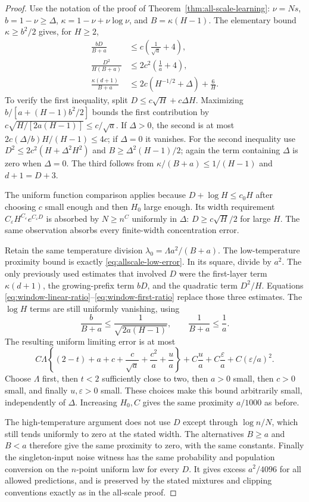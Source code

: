 \begin{proof}
Use the notation of the proof of Theorem~\ref{thm:all-scale-learning}:
$\nu=Ns$, $b=1-\nu\ge\Delta$,
$\kappa=1-\nu+\nu\log\nu$, and $B=\kappa(H-1)$.
The elementary bound $\kappa\ge b^2/2$ gives, for $H\ge2$,
\begin{align}
 \frac{bD}{B+a}
 &\le c\left(\frac1{\sqrt a}+4\right),
 \label{eq:window-linear-ratio}\\
 \frac{D^2}{H(B+a)}
 &\le 2c^2\left(\frac1a+4\right),
 \label{eq:window-quadratic-ratio}\\
 \frac{\kappa(d+1)}{B+a}
 &\le 2c(H^{-1/2}+\Delta)+\frac6H.
 \label{eq:window-first-ratio}
\end{align}
To verify the first inequality, split $D\le c\sqrt H+c\Delta H$.
Maximizing $b/[a+(H-1)b^2/2]$ bounds the first contribution by
$c\sqrt{H/[2a(H-1)]}\le c/\sqrt a$.
If $\Delta>0$, the second is at most
$2c(\Delta/b)H/(H-1)\le4c$; if $\Delta=0$ it vanishes.
For the second inequality use
$D^2\le2c^2(H+\Delta^2H^2)$ and
$B\ge\Delta^2(H-1)/2$; again the term containing $\Delta$ is zero
when $\Delta=0$.
The third follows from $\kappa/(B+a)\le1/(H-1)$ and $d+1=D+3$.

The uniform function comparison applies because
$D+\log H\le c_0H$ after choosing $c$ small enough and then $H_0$
large enough. Its width requirement
$C_\varepsilon H^{C_\varepsilon}e^{C_\varepsilon D}$ is absorbed by
$N\ge n^C$ uniformly in $\Delta$: $D\ge c\sqrt H/2$ for large $H$.
The same observation absorbs every finite-width concentration error.

Retain the same temperature division
$\lambda_0=\Lambda a^2/(B+a)$. The low-temperature proximity bound is
exactly \eqref{eq:allscale-low-error}. In its square, divide by $a^2$.
The only previously used estimates that involved $D$ were the
first-layer term $\kappa(d+1)$, the growing-prefix term $bD$, and
the quadratic term $D^2/H$. Equations
\eqref{eq:window-linear-ratio}--\eqref{eq:window-first-ratio}
replace those three estimates. The $\log H$ terms are still uniformly
vanishing, using
\[
 \frac b{B+a}\le\frac1{\sqrt{2a(H-1)}},\qquad
 \frac1{B+a}\le\frac1a.
\]
The resulting uniform limiting error is at most
\[
 C\Lambda\left\{(2-t)+a+c+\frac c{\sqrt a}
       +\frac{c^2}a+\frac ua\right\}
   +C\frac ua+C\frac\varepsilon a+C(\varepsilon/a)^2.
\]
Choose $\Lambda$ first, then $t<2$ sufficiently close to two,
then $a>0$ small, then $c>0$ small, and finally $u,\varepsilon>0$
small. These choices make this bound arbitrarily small, independently
of $\Delta$. Increasing $H_0,C$ gives the same proximity $a/1000$
as before.

The high-temperature argument does not use $D$ except through
$\log n/N$, which still tends uniformly to zero at the stated width.
The alternatives $B\ge a$ and $B<a$ therefore give the same proximity
to zero, with the same constants. Finally the singleton-input noise
witness has the same probability and population conversion on the
$n$-point uniform law for every $D$. It gives excess $a^2/4096$ for
all allowed predictions, and is preserved by the stated mixtures
and clipping conventions exactly as in the all-scale proof.
\end{proof}

